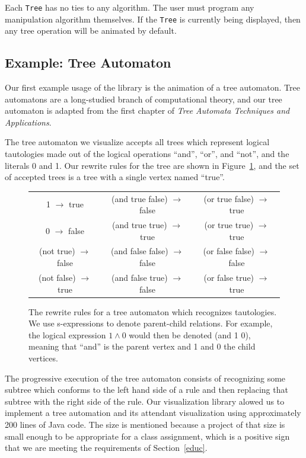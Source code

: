 \documentclass{article}
\newcommand{\java}[1]{\texttt{#1}\index{#1}}
\begin{document}
Each \java{Tree} has no ties to any algorithm.  The user must program any manipulation algorithm themselves.  If the \java{Tree} is currently being displayed, then any tree operation will be animated by default.

\subsection{Example: Tree Automaton}

Our first example usage of the library is the animation of a tree automaton.  Tree automatons are a long-studied branch of computational theory, and our tree automaton is adapted from the first chapter of {\it Tree Automata Techniques and Applications}\cite{tata2007}.

The tree automaton we visualize accepts all trees which represent logical tautologies made out of the logical operations ``and'', ``or'', and ``not'', and the literals 0 and 1.  Our rewrite rules for the tree are shown in Figure~\ref{fig:rules}, and the set of accepted trees is a tree with a single vertex named ``true''.

\begin{figure}
  \begin{tabular}{c c c}
     1 $\to$ true            & (and true false) $\to$ false & (or true false) $\to$ true \\
     0 $\to$ false           & (and true true) $\to$ true & (or true true) $\to$ true \\
     (not true) $\to$ false & (and false false) $\to$ false & (or false false) $\to$ false \\
     (not false) $\to$ true & (and false true) $\to$ false & (or false true) $\to$ true 
    \end{tabular}
\caption{The rewrite rules for a tree automaton which recognizes tautologies. We use s-expressions to denote parent-child relations.  For example, the logical expression $1 \land 0$ would then be denoted (and 1 0), meaning that ``and'' is the parent vertex and 1 and 0 the child vertices.}
\label{fig:rules}
\end{figure}

The progressive execution of the tree automaton consists of recognizing some
subtree which conforms to the left hand side of a rule and then replacing that
subtree with the right side of the rule.  Our visualization library alowed us
to implement a tree automation and its attendant visualization using
approximately 200 lines of Java code.  The size is mentioned because a project of that size is small enough to be appropriate for a class assignment, which is a positive sign that we are meeting the requirements of Section~\ref{educ}.
\end{document}
